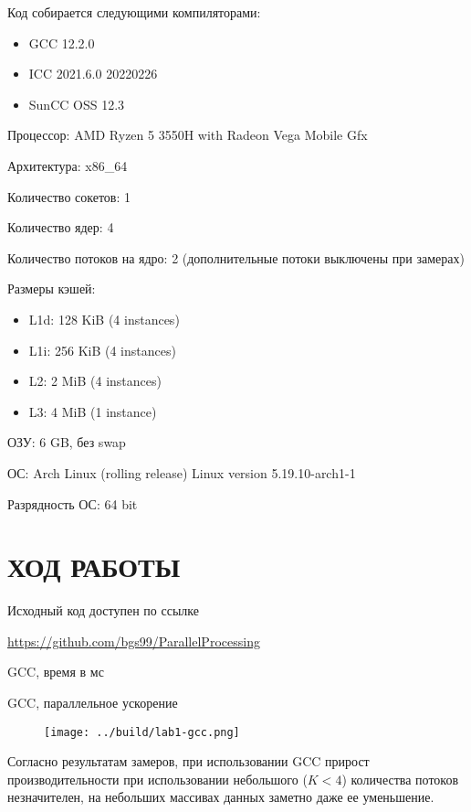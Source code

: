 \documentclass[14pt, a4paper, oneside, final]{extarticle}
\begin{document}
Код собирается следующими компиляторами:
\begin{itemize}
 \setlength{\itemindent}{3em}
 \item GCC 12.2.0
 \item ICC 2021.6.0 20220226
 \item SunCC OSS 12.3
\end{itemize}

Процессор: AMD Ryzen 5 3550H with Radeon Vega Mobile Gfx

Архитектура: x86\_64

Количество сокетов: 1

Количество ядер: 4

Количество потоков на ядро: 2 (дополнительные потоки выключены при замерах)

Размеры кэшей:
\begin{itemize}
 \setlength{\itemindent}{3em}
 \item L1d: 128 KiB (4 instances)
 \item L1i: 256 KiB (4 instances)
 \item L2: 2 MiB (4 instances)
 \item L3: 4 MiB (1 instance)
\end{itemize}

ОЗУ: 6 GB, без swap

ОС: Arch Linux (rolling release) Linux version 5.19.10-arch1-1

Разрядность ОС: 64 bit


\clearpage
\section*{ХОД РАБОТЫ}
Исходный код доступен по ссылке

\url{https://github.com/bgs99/ParallelProcessing}

\clearpage
GCC, время в мс


GCC, параллельное ускорение


\begin{figure}[ht!]

\texttt{[image: ../build/lab1-gcc.png]}
\end{figure}

Согласно результатам замеров, при использовании GCC прирост производительности при использовании небольшого ($K < 4$) количества потоков незначителен, на небольших массивах данных заметно даже ее уменьшение.
\end{document}

